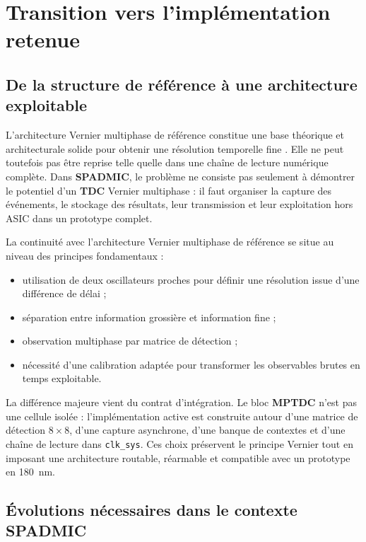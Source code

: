 \chapter{Transition vers l'implémentation retenue}
\label{chap:transition-implementation}
\justifying
\sloppy

\section{De la structure de référence à une architecture exploitable}

L'architecture Vernier multiphase de référence constitue une base théorique et architecturale solide pour obtenir une résolution temporelle fine \cite{annagrebah2021thesis}. Elle ne peut toutefois pas être reprise telle quelle dans une chaîne de lecture numérique complète. Dans \textbf{SPADMIC}, le problème ne consiste pas seulement à démontrer le potentiel d'un \textbf{TDC} Vernier multiphase : il faut organiser la capture des événements, le stockage des résultats, leur transmission et leur exploitation hors ASIC dans un prototype complet.

La continuité avec l'architecture Vernier multiphase de référence se situe au niveau des principes fondamentaux :
\begin{itemize}
    \item utilisation de deux oscillateurs proches pour définir une résolution issue d'une différence de délai ;
    \item séparation entre information grossière et information fine ;
    \item observation multiphase par matrice de détection ;
    \item nécessité d'une calibration adaptée pour transformer les observables brutes en temps exploitable.
\end{itemize}

La différence majeure vient du contrat d'intégration. Le bloc \textbf{MPTDC} n'est pas une cellule isolée : l'implémentation active est construite autour d'une matrice de détection \mbox{$8\times8$}, d'une capture asynchrone, d'une banque de contextes et d'une chaîne de lecture dans \texttt{clk\_sys}. Ces choix préservent le principe Vernier tout en imposant une architecture routable, réarmable et compatible avec un prototype en \SI{180}{\nano\meter}.

\section{Évolutions nécessaires dans le contexte SPADMIC}

